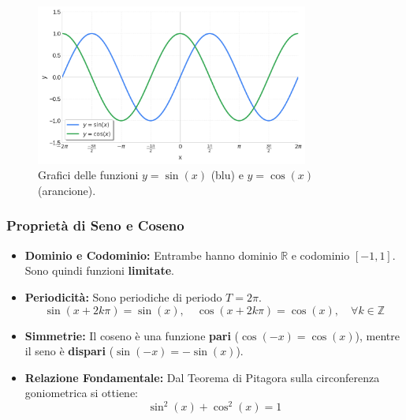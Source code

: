 \begin{figure}[H]
    \centering
    \includegraphics[width=0.8\textwidth]{./img/seno_coseno_grafici.png}
    \caption{Grafici delle funzioni \(y=\sin(x)\) (blu) e \(y=\cos(x)\) (arancione).}
    \label{fig:seno_coseno_grafici}
\end{figure}
\FloatBarrier

\subsubsection{Proprietà di Seno e Coseno}
\begin{itemize}
    \item \textbf{Dominio e Codominio:} Entrambe hanno dominio \(\mathbb{R}\) e codominio \([-1, 1]\). Sono quindi funzioni \textbf{limitate}.
    \item \textbf{Periodicità:} Sono periodiche di periodo \(T = 2\pi\).
    \[ \sin(x + 2k\pi) = \sin(x), \quad \cos(x + 2k\pi) = \cos(x), \quad \forall k \in \mathbb{Z} \]
    \item \textbf{Simmetrie:} Il coseno è una funzione \textbf{pari} (\(\cos(-x) = \cos(x)\)), mentre il seno è \textbf{dispari} (\(\sin(-x) = -\sin(x)\)).
    \item \textbf{Relazione Fondamentale:} Dal Teorema di Pitagora sulla circonferenza goniometrica si ottiene:
    \[ \sin^2(x) + \cos^2(x) = 1 \]
  \end{itemize}
